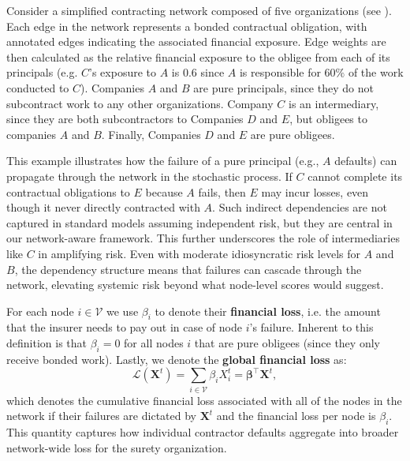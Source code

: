 \documentclass[mnsc,nonblindrev]{informs3}
\newcommand{\GAR}{\mathcal{L}}
\newcommand{\Xvec}{\mathbf{X}}
\newcommand{\betavec}{\mathbf{\beta}}
\begin{document}
\begin{example}
\label{ex:risk_propagation}
Consider a simplified contracting network composed of five organizations (see ).  Each edge in the network represents a bonded contractual obligation, with annotated edges indicating the associated financial exposure.  Edge weights are then calculated as the relative financial exposure to the obligee from each of its principals (e.g. $C$'s exposure to $A$ is $0.6$ since $A$ is responsible for $60\%$ of the work conducted to $C$).
Companies $A$ and $B$ are pure principals, since they do not subcontract work to any other organizations.  Company $C$ is an intermediary, since they are both subcontractors to Companies $D$ and $E$, but obligees to companies $A$ and $B$. Finally, Companies $D$ and $E$ are pure obligees.

This example illustrates how the failure of a pure principal (e.g., $A$ defaults) can propagate through the network in the stochastic process. If $C$ cannot complete its contractual obligations to $E$ because $A$ fails, then $E$ may incur losses, even though it never directly contracted with $A$. Such indirect dependencies are not captured in standard models assuming independent risk, but they are central in our network-aware framework.
%
This further underscores the role of intermediaries like $C$ in amplifying risk.  Even with moderate idiosyncratic risk levels for $A$ and $B$, the dependency structure means that failures can cascade through the network, elevating systemic risk beyond what node-level scores would suggest.
\end{example}

For each node $i \in \mathcal{V}$ we use $\beta_i$ to denote their {\bf financial loss}, i.e. the amount that the insurer needs to pay out in case of node $i$'s failure.  Inherent to this definition is that $\beta_i = 0$ for all nodes $i$ that are {pure obligees} (since they only receive bonded work).  Lastly, we denote the {\bf global financial loss} as:
\begin{equation}
\label{eq:gar}
\GAR(\Xvec^t) = \sum_{i \in \mathcal{V}} \beta_i X_i^{t} = \betavec^\top \Xvec^{t},
\end{equation}
which denotes the cumulative financial loss associated with all of the nodes in the network if their failures are dictated by $\Xvec^t$ and the financial loss per node is $\beta_i$.  This quantity captures how individual contractor defaults aggregate into broader network-wide loss for the surety organization.
\end{document}
